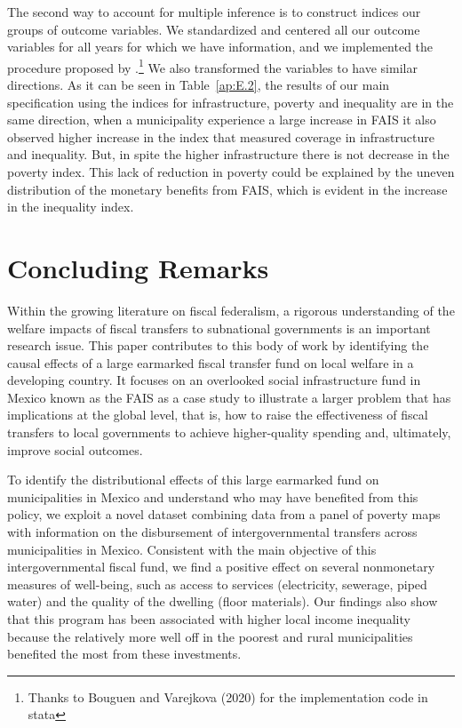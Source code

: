 \documentclass[dv_diss_main.tex]{subfiles}
\begin{document}
The second way to account for multiple inference is to construct indices our groups of outcome variables. We standardized and centered all our outcome variables for all years for which we have information, and we implemented the procedure proposed by \cite{anderson2008multiple}.\footnote{Thanks to Bouguen and Varejkova (2020) for the implementation code in stata} We also transformed the variables to have similar directions. As it can be seen in {Table}~\ref{ap:E.2}, the results of our main specification using the indices for infrastructure, poverty and inequality are in the same direction, when a municipality experience a large increase in FAIS it also observed higher increase in the index that measured coverage in infrastructure and inequality. But, in spite the higher infrastructure there is not decrease in the poverty index. This lack of reduction in poverty could be explained by the uneven distribution of the monetary benefits from FAIS, which is evident in the increase in the inequality index. 

\section{Concluding Remarks} \label{sec: Concluding remarks}

Within the growing literature on fiscal federalism, a rigorous understanding of the welfare impacts of fiscal transfers to subnational governments is an important research issue. This paper contributes to this body of work by identifying the causal effects of a large earmarked fiscal transfer fund on local welfare in a developing country. It focuses on an overlooked social infrastructure fund in Mexico known as the FAIS as a case study to illustrate a larger problem that has implications at the global level, that is, how to raise the effectiveness of fiscal transfers to local governments to achieve higher-quality spending and, ultimately, improve social outcomes.

To identify the distributional effects of this large  earmarked fund on municipalities in Mexico and understand who may have benefited from this policy, we exploit a novel dataset combining data from a panel of poverty maps with information on the disbursement of intergovernmental transfers across municipalities in Mexico. Consistent with the main objective of this intergovernmental fiscal fund, we find a positive effect on several nonmonetary measures of well-being, such as access to services (electricity, sewerage, piped water) and the quality of the dwelling (floor materials). Our findings also show that this program has been associated with higher local income inequality because the relatively more well off in the poorest and rural municipalities benefited the most from these investments.
\end{document}
